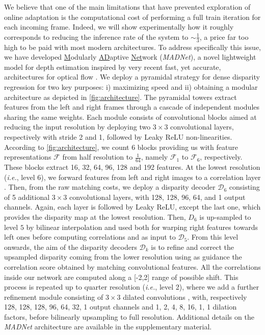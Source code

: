 \documentclass[10pt,twocolumn,letterpaper]{article}
\def\ie{\emph{i.e.}}
\def\netname{\emph{MADNet}}
\def\extendednetname{\underline{M}odularly \underline{AD}aptive \underline{Net}work}
\begin{document}
We believe that one of the main limitations that have prevented exploration of online adaptation is the computational cost of performing a full train iteration for each incoming frame. Indeed, we will show experimentally how it roughly corresponds to reducing the inference rate of the system to $\sim\frac{1}{3}$, a price far too high to be paid with most modern architectures. To address specifically this issue, we have developed \extendednetname{} (\netname{}), a novel lightweight model for depth estimation inspired by very recent fast, yet accurate, architectures for optical flow \cite{Ranjan_2017_CVPR,sun2018pwc}. We deploy a pyramidal strategy for dense disparity regression for two key purposes: i) maximizing speed and ii) obtaining a modular architecture as depicted in \autoref{fig:architecture}. 
The pyramidal towers extract features from the left and right frames through a cascade of independent modules sharing the same weights. Each module consists of convolutional blocks aimed at reducing the input resolution by deploying two $3 \times 3$ convolutional layers, respectively with stride 2 and 1, followed by Leaky ReLU non-linearities. According to \autoref{fig:architecture}, we count 6 blocks providing  us with feature representations $\mathcal{F}$ from half resolution to $\frac{1}{64}$, namely $\mathcal{F}_1$ to $\mathcal{F}_6$, respectively. These blocks extract  16, 32, 64, 96, 128 and 192 features.
At the lowest resolution (\ie, level 6), we forward features from left and right images to a correlation layer \cite{mayer2016large}. Then, from the raw matching costs, we deploy a disparity decoder $\mathcal{D}_6$ consisting of 5 additional $3 \times 3$ convolutional layers,  with 128, 128, 96, 64, and 1 output channels. Again, each layer is followed by Leaky ReLU, except the last one, which provides the disparity map at the lowest resolution. 
Then, $D_6$ is up-sampled to level $5$ by bilinear interpolation and used both for warping right features towards left ones before computing correlations and as input to $\mathcal{D}_{5}$. From this level onwards, the aim of the disparity decoders $\mathcal{D}_{k}$ is to refine and correct the upsampled disparity coming from the lower resolution using as guidance the correlation score obtained by matching convolutional features. All the correlations inside our network are computed along a [-2,2] range of possible shift.
This process is repeated up to quarter resolution (\ie, level 2), where we add a further refinement module consisting  of $3 \times 3$ dilated convolutions \cite{sun2018pwc}, with, respectively 128, 128, 128, 96, 64, 32, 1 output channels and 1, 2, 4, 8, 16, 1, 1 dilation factors, before bilinearly upsampling to full resolution. Additional details on the \netname{}  architecture are available in the supplementary material.
\end{document}
